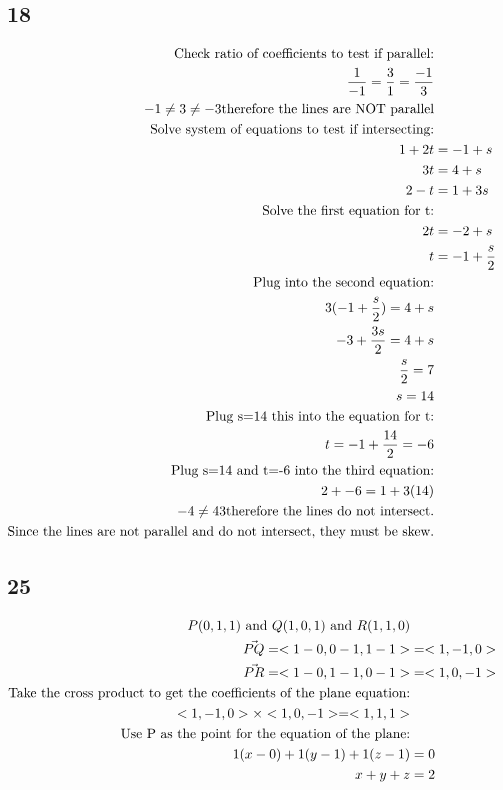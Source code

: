 \documentclass{article}%
\begin{document}
\subsection*{18}%
\begin{alignat*}{2}%
\textnormal{Check ratio of coefficients to test if parallel:}\\%
\frac{1}{-1} = \frac{3}{1} = \frac{-1}{3}\\%
-1 \neq 3 \neq -3 \textnormal{therefore the lines are NOT parallel}\\%
\textnormal{Solve system of equations to test if intersecting:}\\%
1 +2t &= -1+s\\%
3t &= 4+s\\%
2-t &= 1+3s\\%
\textnormal{Solve the first equation for t:}\\%
2t &=-2+s\\%
t &= -1 + \frac{s}{2}\\%
\textnormal{Plug into the second equation:}\\%
3(-1+\frac{s}{2}) = 4+s\\%
-3+\frac{3s}{2} = 4+s\\%
\frac{s}{2} = 7\\%
s = 14\\%
\textnormal{Plug s=14 this into the equation for t:}\\%
t=-1+\frac{14}{2} = -6\\%
\textnormal{Plug s=14 and t=-6 into the third equation:}\\%
2+-6 = 1+3(14)\\%
-4 \neq 43 \textnormal{therefore the lines do not intersect.}\\%
\textnormal{Since the lines are not parallel and do not intersect, they must be skew.}\\%
\end{alignat*}

%
\subsection*{25}%
\begin{alignat*}{2}%
P(0,1,1) \textnormal{ and }Q(1,0,1) \textnormal{ and }R(1,1,0)\\%
\vec{PQ} = <1-0,0-1,1-1> &= <1,-1,0>\\%
\vec{PR} = <1-0,1-1,0-1> &= <1,0,-1>\\%
\textnormal{Take the cross product to get the coefficients of the plane equation:}\\%
<1,-1,0> \times <1,0,-1> = <1,1,1> \\%
\textnormal{Use P as the point for the equation of the plane:}\\%
1(x-0)+1(y-1)+1(z-1) &= 0\\%
x+y+z &=2\\%
\end{alignat*}
\end{document}
